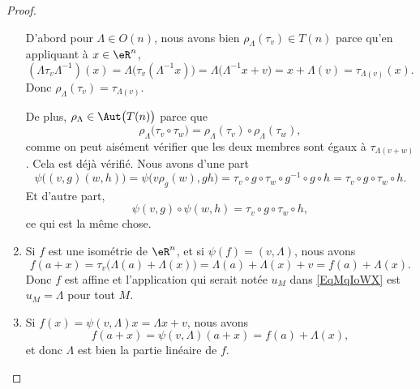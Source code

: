 \begin{proof}
\begin{enumerate}
\begin{subproof}
			      D'abord pour \( \Lambda\in O(n)\), nous avons bien \( \rho_{\Lambda}(\tau_v)\in T(n)\) parce qu'en appliquant à \( x\in \eR^n\),
			      \begin{equation}
				      (\Lambda\tau_v\Lambda^{-1})(x)=\Lambda\big( \tau_v(\Lambda^{-1} x) \big)=\Lambda\big( \Lambda^{-1}x+v \big)=x+\Lambda(v)=\tau_{\Lambda(v)}(x).
			      \end{equation}
			      Donc \( \rho_{\Lambda}(\tau_v)=\tau_{\Lambda(v)}\).

			      De plus, \( \rho_{\Lambda}\in\Aut\big( T(n) \big)\) parce que
			      \begin{equation}
				      \rho_{\Lambda}\big( \tau_v\circ \tau_w \big)=\rho_{\Lambda}(\tau_v)\circ\rho_{\Lambda}(\tau_w),
			      \end{equation}
			      comme on peut aisément vérifier que les deux membres sont égaux à \( \tau_{\Lambda(v+w)}\).
			      Cela est déjà vérifié.
			      Nous avons d'une part
			      \begin{equation}
				      \psi\big( (v,g)(w,h) \big)=\psi\big( v\rho_g(w),gh \big)=\tau_v\circ g\circ\tau_w\circ g^{-1}\circ g\circ h=\tau_v\circ g\circ\tau_w\circ h.
			      \end{equation}
			      Et d'autre part,
			      \begin{equation}
				      \psi(v,g)\circ\psi(w,h)=\tau_v\circ g\circ \tau_w\circ h,
			      \end{equation}
			      ce qui est la même chose.
		      \end{subproof}
		\item
		      Si \(f \) est une isométrie de \( \eR^n\), et si \( \psi(f)=(v,\Lambda)\), nous avons
		      \begin{equation}
			      f(a+x)=\tau_v\big( \Lambda(a)+\Lambda(x) \big)=\Lambda(a)+\Lambda(x)+v=f(a)+\Lambda(x).
		      \end{equation}
		      Donc \( f\) est affine et l'application qui serait notée \( u_M\) dans \eqref{EqMqIoWX} est \( u_M=\Lambda\) pour tout \( M\).
		\item
		      Si \( f(x)=\psi(v,\Lambda)x=\Lambda x+v\), nous avons
		      \begin{equation}
			      f(a+x)=\psi(v,\Lambda)(a+x)=f(a)+\Lambda(x),
		      \end{equation}
		      et donc \( \Lambda\) est bien la partie linéaire de \( f\).
	\end{enumerate}
\end{proof}

